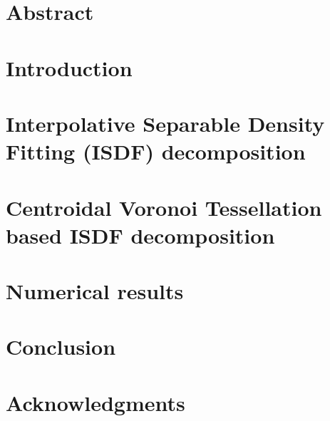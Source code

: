 \section{Abstract}\label{c5sec:abs}
	

\section{Introduction}\label{c5sec:int}
	

\section{Interpolative Separable Density Fitting (ISDF) decomposition}
	\label{c5sec:bac}
	

\section{Centroidal Voronoi Tessellation based ISDF decomposition}
	\label{c5sec:met}
	

\section{Numerical results}\label{c5sec:num}
	

\section{Conclusion}\label{c5sec:con}
	

\section{Acknowledgments}\label{c5sec:ack}
	